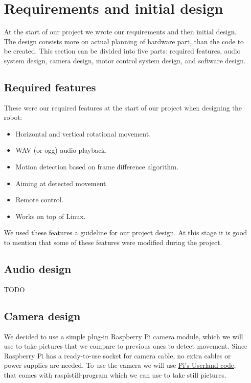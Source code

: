 \documentclass[english,11pt,twoside,a4paper]{article}
\begin{document}
\section{Requirements and initial design}

At the start of our project we wrote our requirements and then initial design. The design consists more on actual planning of hardware part, than the code to be created. This section can be divided into five parts: required features, audio system design, camera design, motor control system design, and software design.

\subsection{Required features}

These were our required features at the start of our project when designing the robot:

\begin{itemize}
  \item Horizontal and vertical rotational movement.
  \item WAV (or ogg) audio playback.
  \item Motion detection based on frame difference algorithm.
  \item Aiming at detected movement.
  \item Remote control.
  \item Works on top of Linux.
\end{itemize}

We used these features a guideline for our project design. At this stage it is good to mention that some of these features were modified during the project.

\subsection{Audio design}

TODO

\subsection{Camera design}

We decided to use a simple plug-in Raspberry Pi camera module, which we will use to take pictures that we compare to previous ones to detect movement. Since Raspberry Pi has a ready-to-use socket for camera cable, no extra cables or power supplies are needed. To use the camera we will use \href{https://github.com/raspberrypi/userland}{Pi's Userland code}, that comes with raspistill-program which we can use to take still pictures.
\end{document}
